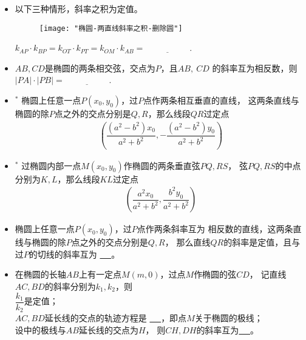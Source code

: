 \documentclass{article}
\newif\ifte
\begin{document}
\begin{multicols}{2}
\begin{enumerate}[leftmargin=20pt]
\begin{itemize}[leftmargin=-4pt]
\item 以下三种情形，斜率之积为定值。
\begin{figure}[H]
    \centering
    \texttt{[image: "椭圆-两直线斜率之积-删除圆"]}
\end{figure}
$ k_{AP}\cdot k_{BP}=k_{OT}\cdot k_{PT}=k_{OM}\cdot k_{AB}=
\underline{\ \ifte -\dfrac{b^2}{a^2}\else \hspace{2cm} \fi\ } $.

\item $AB,CD$是椭圆的两条相交弦，交点为$P$，且$ AB,\ CD $
的斜率互为相反数，则$ |PA|\cdot|PB|=\underline{\ \ifte 
    |PC|\cdot|PD| \else \hspace{2cm} \fi\ } $. 

\item $^*$ 椭圆上任意一点$ P(x_0,y_0) $，过$ P $点作两条相互垂直的直线，
这两条直线与椭圆的除$ P $点之外的交点分别是$ Q,R $，那么线段$ QR $过定点
\begin{gather*}
    \left(\dfrac{(a^2-b^2)x_0}{a^2+b^2},-\dfrac{(a^2-b^2)y_0}{a^2+b^2}\right)
\end{gather*}

\item $^*$ 过椭圆内部一点$ M(x_0,y_0) $作椭圆的两条垂直弦$ PQ,RS $，
弦$ PQ,RS $的中点分别为$ K,L $，那么线段$ KL $过定点
\begin{gather*}
    \left(\dfrac{a^2x_0}{a^2+b^2},\dfrac{b^2y_0}{a^2+b^2}\right)
\end{gather*}

\item 椭圆上任意一点$ P(x_0,y_0) $，过$ P $点作两条斜率互为
相反数的直线，这两条直线与椭圆的除$ P $点之外的交点分别是$ Q,R $，
那么直线$ QR $的斜率是定值，且与过$ P $的切线的斜率互为
\underline{\ \ifte 相反数\else \hspace{2cm} \fi\ }。

\item 在椭圆的长轴$ AB $上有一定点$ M(m,0) $，过点$ M $作椭圆的弦$ CD $，
记直线$ AC,BD $的斜率分别为$ k_{1},k_{2} $，则 \\
 $ \dfrac{k_{1}}{k_{2}} $是定值；\\
  $ AC,BD $延长线的交点的轨迹方程是
\underline{\ \ifte $ x=\dfrac{a^2}{m} $
    \else \hspace{1.5cm} \fi\ }，即点$ M $关于椭圆的极线；\\
 设中的极线与$ AB $延长线的交点为$ H $，
    则$ CH, DH $的斜率互为\underline{\ \ifte 相反数
        \else \hspace{2cm} \fi\ }。


\end{itemize}
\end{enumerate}
\end{multicols}
\end{document}
